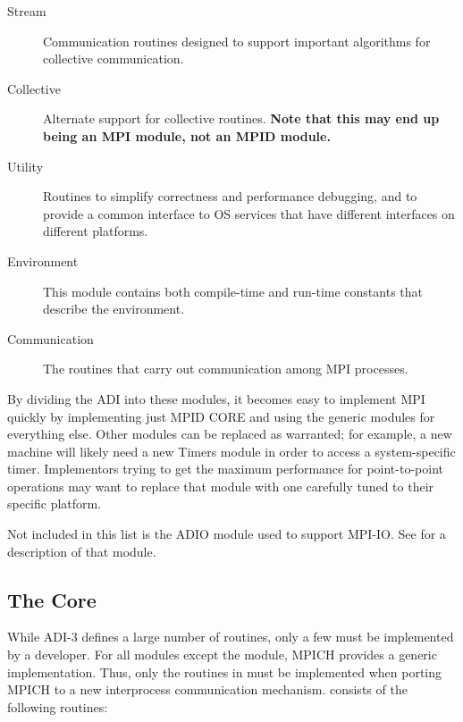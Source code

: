 \documentclass{article}
\begin{document}
\begin{description}
\item[Stream]Communication routines designed to support
important algorithms for collective communication.
\item[Collective]Alternate support for collective
routines. \textbf{Note that this may end up being an MPI module, not
an MPID module.}
\item[Utility]Routines to simplify correctness and performance
debugging, and to provide a common interface to OS services that have
different interfaces on different platforms.
\item[Environment]This module contains both compile-time and run-time
constants that describe the environment. 
\item[Communication] The routines that carry out communication among MPI
  processes. 
\end{description}

By dividing the ADI into these modules, it becomes easy to implement
MPI quickly by implementing just MPID CORE and using the generic
modules for everything else.  Other modules can be replaced as
warranted; for example, a new machine will likely need a new Timers
module in order to access a system-specific timer.  Implementors
trying to get the maximum performance for point-to-point operations
may want to replace that module with one carefully tuned to their
specific platform.

Not included in this list is the ADIO module used to support MPI-IO.
See \cite{romio-adio-manual} for a description of that module.

\subsection{The Core}
\label{sec-minimal}

While ADI-3 defines a large number of routines, only a few must be implemented
by a developer.  For all modules except the  module, MPICH
provides a generic implementation.  Thus, only the routines in
 must be implemented when porting MPICH to a new interprocess
communication mechanism.   consists of the following routines: 
\end{document}
